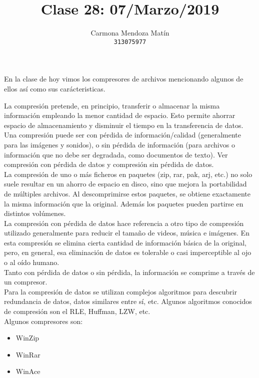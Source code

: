 \documentclass[11pt, a4paper]{report}
\begin{document}
\title{Clase 28: 07/Marzo/2019}
\author{
  Carmona Mendoza Mat\'in\\
  \texttt{313075977}
}
\date{}
\maketitle

En la clase de hoy vimos los compresores de archivos mencionando algunos de
ellos así como sus carácteristicas.

La compresión pretende, en principio, transferir o almacenar la misma
información empleando la menor cantidad de espacio. Esto permite ahorrar
espacio de almacenamiento y disminuir el tiempo en la transferencia de datos. \\

Una compresión puede ser con pérdida de información/calidad (generalmente para
las imágenes y sonidos), o sin pérdida de información (para archivos o
información que no debe ser degradada, como documentos de texto). Ver
compresión con pérdida de datos y compresión sin pérdida de datos. \\

La compresión de uno o más ficheros en paquetes (zip, rar, pak, arj, etc.) no
solo suele resultar en un ahorro de espacio en disco, sino que mejora la
portabilidad de múltiples archivos. Al descomprimirse estos paquetes, se
obtiene exactamente la misma información que la original. Además los paquetes
pueden partirse en distintos volúmenes.\\

La compresión con pérdida de datos hace referencia a otro tipo de compresión utilizado generalmente para reducir el tamaño de videos, música e imágenes. En esta compresión se elimina cierta cantidad de información básica de la original, pero, en general, esa eliminación de datos es tolerable o casi imperceptible al ojo o al oído humano. \\

Tanto con pérdida de datos o sin pérdida, la información se comprime a través
de un compresor. \\

Para la compresión de datos se utilizan complejos algoritmos para descubrir
redundancia de datos, datos similares entre sí, etc. Algunos algoritmos
conocidos de compresión son el RLE, Huffman, LZW, etc. \\

Algunos compresores son:

\begin{itemize}
\item WinZip
\item WinRar
\item WinAce
\end{itemize}
\end{document}
